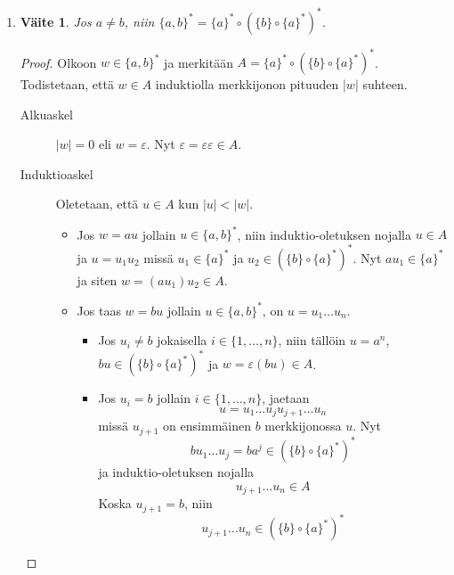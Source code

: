 \documentclass[a4paper,11pt,draft]{article}
\newtheorem*{claim}{Väite}
\begin{document}
\begin{enumerate}
\begin{enumerate}
  \item
    \begin{claim}
      Jos $a \neq b$, niin $\{a,b\}^* = \{a\}^* \circ (\{b\} \circ \{a\}^*)^*$.
    \end{claim}
    \begin{proof}
      Olkoon $w \in \{a,b\}^*$ ja merkitään $A = \{a\}^* \circ
      \left(\{b\} \circ \{a\}^*\right)^*$. Todistetaan, että $w \in A$
      induktiolla merkkijonon pituuden $|w|$ suhteen.
      \begin{description}
      \item[Alkuaskel]
        $|w| = 0$ eli $w = \varepsilon$. Nyt $\varepsilon =
        \varepsilon\varepsilon \in A$.
      \item[Induktioaskel]
        Oletetaan, että $u \in A$ kun $|u| < |w|$.
        \begin{itemize}
        \item
          Jos $w = au$ jollain $u \in \{a,b\}^*$, niin
          induktio-oletuksen nojalla $u \in A$ ja $u = u_1u_2$ missä
          $u_1 \in \{a\}^*$ ja $u_2 \in (\{b\} \circ \{a\}^*)^*$.
          Nyt $au_1 \in \{a\}^*$ ja siten $w = (au_1)u_2 \in A$.
        \item
          Jos taas $w = bu$ jollain $u \in \{a,b\}^*$, on $u = u_1
          \ldots u_n$.
          \begin{itemize}
          \item
            Jos $u_i \neq b$ jokaisella $i \in \{1, \ldots, n\}$,
            niin tällöin $u = a^n$, $bu \in (\{b\} \circ
            \{a\}^*)^*$ ja $w = \varepsilon (bu) \in A$.
          \item
            Jos $u_i = b$ jollain $i \in \{1, \ldots, n\}$, jaetaan
            \begin{equation*}
              u = u_1 \ldots u_ju_{j+1} \ldots u_n
            \end{equation*}
            missä $u_{j+1}$ on ensimmäinen $b$ merkkijonossa $u$. Nyt
            \begin{equation*}
              bu_1 \ldots u_j = ba^j \in (\{b\} \circ \{a\}^*)^*
            \end{equation*}
            ja induktio-oletuksen nojalla
            \begin{equation*}
              u_{j+1} \ldots u_n \in A
            \end{equation*}
            Koska $u_{j+1} = b$, niin
            \begin{equation*}
              u_{j+1} \ldots u_n \in (\{b\} \circ \{a\}^*)^*

\end{equation*}
\end{itemize}
\end{itemize}
\end{description}
\end{proof}
\end{enumerate}
\end{enumerate}
\end{document}
